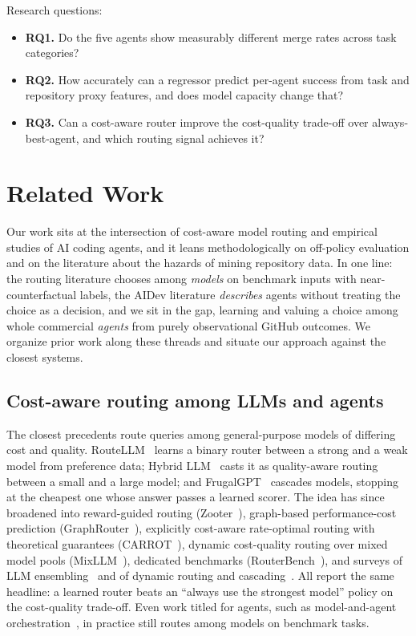 \documentclass[sigconf,nonacm]{acmart}
\begin{document}
Research questions:
\begin{itemize}
  \item \textbf{RQ1.} Do the five agents show measurably different merge rates across task categories?
  \item \textbf{RQ2.} How accurately can a regressor predict per-agent success from task and repository proxy features, and does model capacity change that?
  \item \textbf{RQ3.} Can a cost-aware router improve the cost-quality trade-off over always-best-agent, and which routing signal achieves it?
\end{itemize}

\section{Related Work}

Our work sits at the intersection of cost-aware model routing and empirical studies of AI coding agents, and it leans methodologically on off-policy evaluation and on the literature about the hazards of mining repository data. In one line: the routing literature chooses among \emph{models} on benchmark inputs with near-counterfactual labels, the AIDev literature \emph{describes} agents without treating the choice as a decision, and we sit in the gap, learning and valuing a choice among whole commercial \emph{agents} from purely observational GitHub outcomes. We organize prior work along these threads and situate our approach against the closest systems.

\subsection{Cost-aware routing among LLMs and agents}\label{sec:rw-routing}

The closest precedents route queries among general-purpose models of differing cost and quality. RouteLLM~\cite{ong2024routellm} learns a binary router between a strong and a weak model from preference data; Hybrid LLM~\cite{ding2024hybrid} casts it as quality-aware routing between a small and a large model; and FrugalGPT~\cite{chen2024frugalgpt} cascades models, stopping at the cheapest one whose answer passes a learned scorer. The idea has since broadened into reward-guided routing (Zooter~\cite{lu2023routing}), graph-based performance-cost prediction (GraphRouter~\cite{GraphRouter}), explicitly cost-aware rate-optimal routing with theoretical guarantees (CARROT~\cite{somerstep2025carrot}), dynamic cost-quality routing over mixed model pools (MixLLM~\cite{wang2025mixllm}), dedicated benchmarks (RouterBench~\cite{hu2024routerbench}), and surveys of LLM ensembling~\cite{ensemble2025survey} and of dynamic routing and cascading~\cite{moslem2026routingsurvey}. All report the same headline: a learned router beats an ``always use the strongest model'' policy on the cost-quality trade-off. Even work titled for agents, such as model-and-agent orchestration~\cite{guo2025orchestration}, in practice still routes among models on benchmark tasks.
\end{document}
